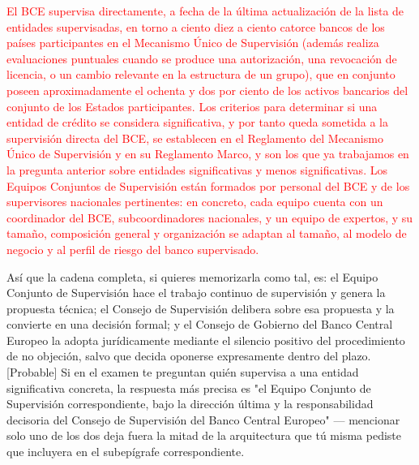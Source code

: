 \documentclass[10pt,a4paper]{article}
\begin{document}
{\textcolor{red}{El BCE supervisa directamente, a fecha de la última actualización de la lista de entidades supervisadas, en torno a ciento diez a ciento catorce bancos de los países participantes en el Mecanismo Único de Supervisión (además realiza evaluaciones puntuales cuando se produce una autorización, una revocación de licencia, o un cambio relevante en la estructura de un grupo), que en conjunto poseen aproximadamente el ochenta y dos por ciento de los activos bancarios del conjunto de los Estados participantes. Los criterios para determinar si una entidad de crédito se considera significativa, y por tanto queda sometida a la supervisión directa del BCE, se establecen en el Reglamento del Mecanismo Único de Supervisión y en su Reglamento Marco, y son los que ya trabajamos en la pregunta anterior sobre entidades significativas y menos significativas. Los Equipos Conjuntos de Supervisión están formados por personal del BCE y de los supervisores nacionales pertinentes: en concreto, cada equipo cuenta con un coordinador del BCE, subcoordinadores nacionales, y un equipo de expertos, y su tamaño, composición general y organización se adaptan al tamaño, al modelo de negocio y al perfil de riesgo del banco supervisado.}

Así que la cadena completa, si quieres memorizarla como tal, es: el Equipo Conjunto de Supervisión hace el trabajo continuo de supervisión y genera la propuesta técnica; el Consejo de Supervisión delibera sobre esa propuesta y la convierte en una decisión formal; y el Consejo de Gobierno del Banco Central Europeo la adopta jurídicamente mediante el silencio positivo del procedimiento de no objeción, salvo que decida oponerse expresamente dentro del plazo. [Probable] Si en el examen te preguntan quién supervisa a una entidad significativa concreta, la respuesta más precisa es "el Equipo Conjunto de Supervisión correspondiente, bajo la dirección última y la responsabilidad decisoria del Consejo de Supervisión del Banco Central Europeo" — mencionar solo uno de los dos deja fuera la mitad de la arquitectura que tú misma pediste que incluyera en el subepígrafe correspondiente.

}
\end{document}
